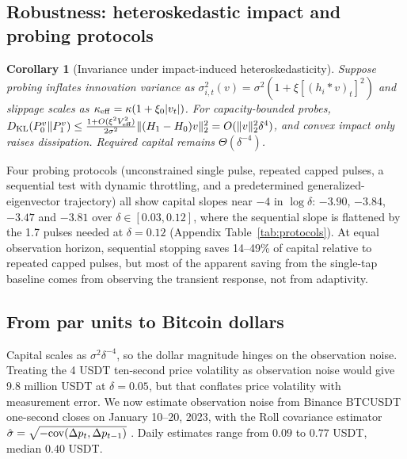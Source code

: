 \documentclass[12pt]{article}
\newtheorem{corollary}[theorem]{Corollary}
\theoremstyle{definition}
\theoremstyle{remark}
\newcommand{\KL}{D_{\mathrm{KL}}}
\begin{document}
\subsection{Robustness: heteroskedastic impact and probing protocols}

\begin{corollary}[Invariance under impact-induced heteroskedasticity]\label{cor:garch}
Suppose probing inflates innovation variance as $\sigma^2_{i,t}(v)=\sigma^2(1+\xi[(h_i*v)_t]^2)$ and slippage scales as $\kappa_{\rm eff}=\kappa(1+\xi_0|v_t|)$. For capacity-bounded probes, $\KL(P_0^v\|P_1^v)\le\frac{1+O(\xi^2V_{\rm eff}^2)}{2\sigma^2}\|(H_1-H_0)v\|_2^2=O(\|v\|_2^2\delta^4)$, and convex impact only raises dissipation. Required capital remains $\Theta(\delta^{-4})$.
\end{corollary}

Four probing protocols (unconstrained single pulse, repeated capped pulses, a sequential test with dynamic throttling, and a predetermined generalized-eigenvector trajectory) all show capital slopes near $-4$ in $\log\delta$: $-3.90$, $-3.84$, $-3.47$ and $-3.81$ over $\delta\in[0.03,0.12]$, where the sequential slope is flattened by the 1.7 pulses needed at $\delta=0.12$ (Appendix Table~\ref{tab:protocols}). At equal observation horizon, sequential stopping saves 14--49\% of capital relative to repeated capped pulses, but most of the apparent saving from the single-tap baseline comes from observing the transient response, not from adaptivity.

\subsection{From par units to Bitcoin dollars}\label{sec:dollars}

Capital scales as $\sigma^2\delta^{-4}$, so the dollar magnitude hinges on the observation noise. Treating the 4 USDT ten-second price volatility as observation noise would give 9.8 million USDT at $\delta=0.05$, but that conflates price volatility with measurement error. We now estimate observation noise from Binance BTCUSDT one-second closes on January 10--20, 2023, with the Roll covariance estimator $\hat\sigma=\sqrt{-{\rm cov}(\Delta p_t,\Delta p_{t-1})}$ \citep{roll1984}. Daily estimates range from $0.09$ to $0.77$ USDT, median $0.40$ USDT.
\end{document}
